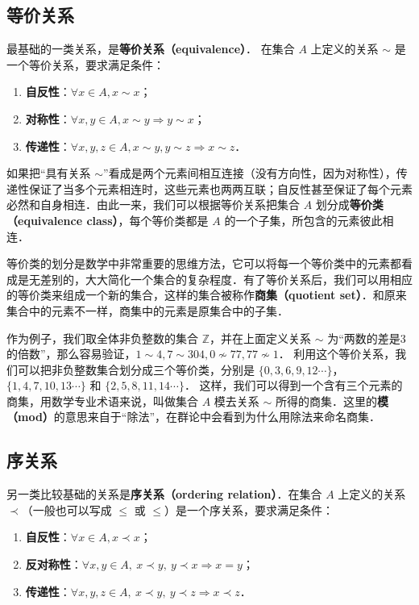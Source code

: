 \subsection{等价关系}
最基础的一类关系，是\textbf{等价关系（equivalence）}． 在集合 $A$ 上定义的关系 $\sim$ 是一个等价关系，要求满足条件：
\begin{enumerate}
\item \textbf{自反性}：$\forall x\in A, x\sim x$；
\item \textbf{对称性}：$\forall x, y\in A, x\sim y \Rightarrow y\sim x$；
\item \textbf{传递性}：$\forall x, y, z\in A, x\sim y, y\sim z\Rightarrow x\sim z$．
\end{enumerate}
如果把“具有关系 $\sim$”看成是两个元素间相互连接（没有方向性，因为对称性），传递性保证了当多个元素相连时，这些元素也两两互联；自反性甚至保证了每个元素必然和自身相连．由此一来，我们可以根据等价关系把集合 $A$ 划分成\textbf{等价类（equivalence class）}，每个等价类都是 $A$ 的一个子集，所包含的元素彼此相连．

等价类的划分是数学中非常重要的思维方法，它可以将每一个等价类中的元素都看成是无差别的，大大简化一个集合的复杂程度．有了等价关系后，我们可以用相应的等价类来组成一个新的集合，这样的集合被称作\textbf{商集（quotient set）}．和原来集合中的元素不一样，商集中的元素是原集合中的子集．

作为例子，我们取全体非负整数的集合 $\mathbb{Z}$，并在上面定义关系 $\sim$ 为“两数的差是3的倍数”，那么容易验证，$1\sim4, 7\sim304, 0\not\sim 77, 77\not\sim 1$． 利用这个等价关系，我们可以把非负整数集合划分成三个等价类，分别是 $\{0, 3, 6, 9, 12\cdots \}$，$\{1, 4, 7, 10, 13\cdots\}$ 和 $\{2, 5, 8, 11, 14\cdots\}$． 这样，我们可以得到一个含有三个元素的商集，用数学专业术语来说，叫做集合 $A$ 模去关系 $\sim$ 所得的商集．这里的\textbf{模（mod）}的意思来自于“除法”，在群论中会看到为什么用除法来命名商集．

\subsection{序关系}
另一类比较基础的关系是\textbf{序关系（ordering relation）}．在集合 $A$ 上定义的关系 $\prec$（一般也可以写成 $\leq$ 或 $\leqslant$）是一个序关系，要求满足条件：
\begin{enumerate}
\item \textbf{自反性}：$\forall x\in A,x\prec x$；
\item \textbf{反对称性}：$\forall x,y\in A,\ x\prec y,\ y\prec x \Rightarrow x = y $；
\item \textbf{传递性}：$\forall x,y,z\in A,\ x\prec y,\ y\prec z \Rightarrow x\prec z $．
\end{enumerate}

